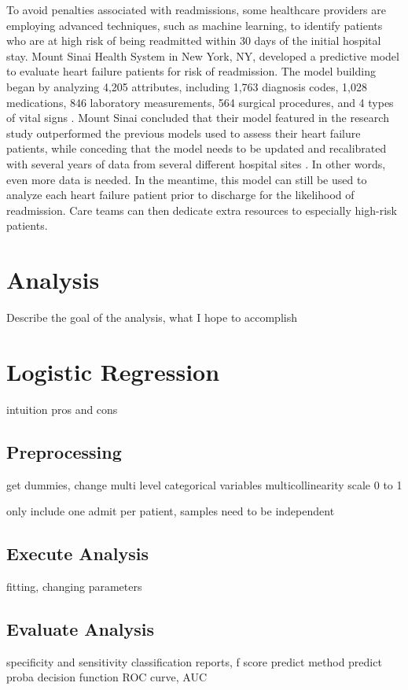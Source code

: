 \documentclass[sigconf]{acmart}
\begin{document}
 To avoid penalties associated with readmissions, some healthcare providers are employing advanced techniques, such as machine learning, to identify patients who are at high risk of being readmitted within 30 days of the initial hospital stay. Mount Sinai Health System in New York, NY, developed a predictive model to evaluate heart failure patients for risk of readmission. The model building began by analyzing 4,205 attributes, including 1,763 diagnosis codes, 1,028 medications, 846 laboratory measurements, 564 surgical procedures, and 4 types of vital signs \cite{cite01}. Mount Sinai concluded that their model featured in the research study outperformed the previous models used to assess their heart failure patients, while conceding that the model needs to be updated and recalibrated with several years of data from several different hospital sites \cite{cite01}. In other words, even more data is needed. In the meantime, this model can still be used to analyze each heart failure patient prior to discharge for the likelihood of readmission. Care teams can then dedicate extra resources to especially high-risk patients.



\section{Analysis}

Describe the goal of the analysis, what I hope to accomplish

\section{Logistic Regression}

intuition
pros and cons

\subsection{Preprocessing}
get dummies, change multi level categorical variables
multicollinearity
scale 0 to 1

only include one admit per patient, samples need to be independent

\subsection{Execute Analysis}
fitting, changing parameters

\subsection{Evaluate Analysis}
specificity and sensitivity
classification reports, f score
predict method
predict proba
decision function
ROC curve, AUC
\end{document}
